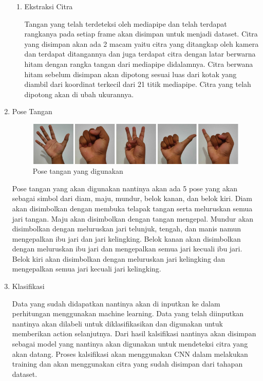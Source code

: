\begin{enumerate}
\begin{enumerate}
  \item Ekstraksi Citra \par
  Tangan yang telah terdeteksi oleh mediapipe dan telah terdapat rangkanya pada setiap frame akan disimpan untuk menjadi dataset. Citra yang disimpan akan ada 2 macam yaitu citra yang ditangkap oleh kamera dan terdapat ditangannya dan juga terdapat citra dengan latar berwarna hitam dengan rangka tangan dari mediapipe didalamnya. Citra berwana hitam sebelum disimpan akan dipotong sesuai luas dari kotak yang diambil dari koordinat terkecil dari 21 titik mediapipe. Citra yang telah dipotong akan di ubah ukurannya.
\end{enumerate}

  \item Pose Tangan \par
  
  \begin{figure}[!h]
    \centering
    \includegraphics[width=0.7\linewidth]{gambar/pose.png}
    \caption{Pose tangan yang digunakan}
    \label{fig:gambarpose}
  \end{figure}

  Pose tangan yang akan digunakan nantinya akan ada 5 pose yang akan sebagai simbol dari diam, maju, mundur, belok kanan, dan belok kiri. Diam akan disimbolkan dengan membuka telapak tangan serta meluruskan semua jari tangan. Maju akan disimbolkan dengan tangan mengepal. Mundur akan disimbolkan dengan meluruskan jari telunjuk, tengah, dan manis namun mengepalkan ibu jari dan jari kelingking. Belok kanan akan disimbolkan dengan meluruskan ibu jari dan mengepalkan semua jari kecuali ibu jari. Belok kiri akan disimbolkan dengan meluruskan jari kelingking dan mengepalkan semua jari kecuali jari kelingking.

  \item Klasifikasi \par
  Data yang sudah didapatkan nantinya akan di inputkan ke dalam perhitungan menggunakan machine learning. Data yang telah diinputkan nantinya akan dilabeli untuk diklasifikasikan dan digunakan untuk memberikan action selanjutnya. Dari hasil kalsifikasi nantinya akan disimpan sebagai model yang nantinya akan digunakan untuk mendeteksi citra yang akan datang. Proses kalsifikasi akan menggunakan CNN dalam melakukan training dan akan menggunakan citra yang sudah disimpan dari tahapan dataset. 
  

\end{enumerate}

